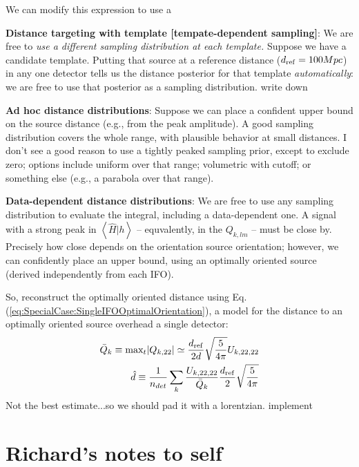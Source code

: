 \documentclass[twocolumn,prd,nofootinbib]{revtex4}
\newcommand\editremark[1]{{\color{red} #1}}
\newcommand\qmstateproduct[2]{\left\langle#1|#2\right\rangle}
\begin{document}
\begin{widetext}
\begin{shaded}
We can modify this expression to use a 

\noindent \textbf{Distance targeting with template [tempate-dependent sampling]}: We are free to \emph{use a different
  sampling distribution at each template.}  Suppose we have a candidate template.  Putting that source at a
reference distance ($d_{\rm ref}=100 Mpc$) in any one detector tells us the distance posterior for that template \emph{automatically}: we
are free to use that posterior as a sampling distribution.   \editremark{write down}
\end{shaded}


\noindent \textbf{Ad hoc distance distributions}: Suppose we can place a confident upper bound on the source distance (e.g.,
from the peak amplitude).  A good sampling distribution covers the whole range, with plausible behavior at small
distances.
%
I don't see a good reason to use a tightly peaked sampling prior, except to exclude zero; options include  uniform over
that range; volumetric with cutoff; or something else (e.g., a parabola over that range).



\noindent \textbf{Data-dependent distance distributions}: We are free to use any sampling distribution to evaluate the
integral, including a data-dependent one.   A signal with a strong peak in $\qmstateproduct{\hat{H}}{h}$ -- equvalently,
in the $Q_{k,lm}$ -- must be close by.  Precisely how close depends on the orientation source orientation; however, we
can confidently place an upper bound, using an optimally oriented source (derived independently from each IFO).

So,  reconstruct the optimally oriented distance using Eq. (\ref{eq:SpecialCase:SingleIFOOptimalOrientation}), a model for the distance to an
optimally oriented source overhead a single detector:
\begin{eqnarray}
\bar{Q}_k \equiv  \text{max}_t |Q_{k,22}| \simeq \frac{d_{\rm ref}}{2 d} \sqrt{\frac{5}{4\pi}} U_{k,22,22} \\
\hat{d} \equiv \frac{1}{n_{det}}\sum_k\frac{U_{k,22,22}}{\bar{Q}_k} \frac{d_{\rm ref}}{2} \sqrt{\frac{5}{4\pi}}
\end{eqnarray}
Not the best estimate...so we should pad it with a lorentzian. \editremark{implement}

\end{widetext}


\part{Richard's notes to self}
\end{document}

